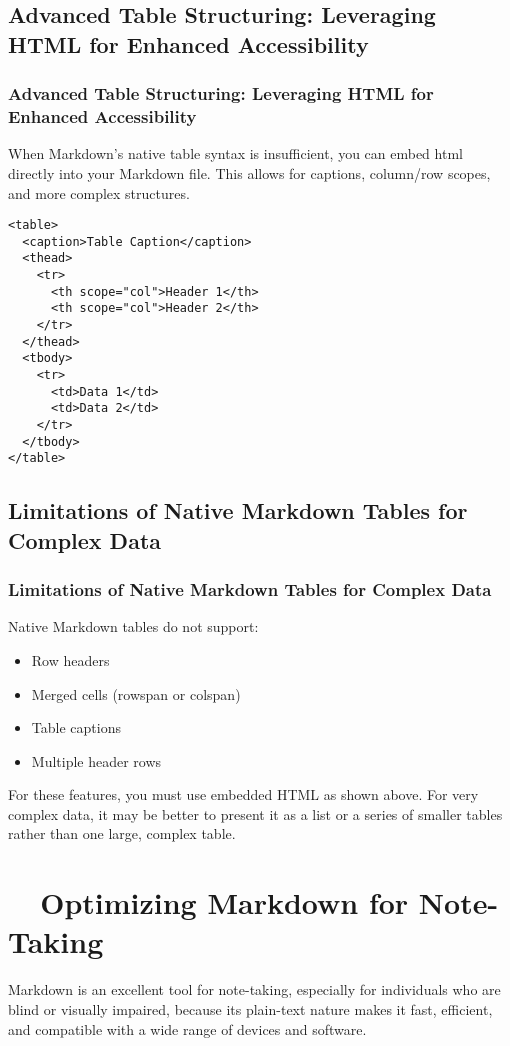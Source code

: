 \subsection{Advanced Table Structuring: Leveraging HTML for Enhanced Accessibility}
\label{subsec:markdown-html-tables}
\subsubsection{Advanced Table Structuring: Leveraging HTML for Enhanced Accessibility}
\label{ssubsec:markdown-html-tables-details}
When Markdown's native table syntax is insufficient, you can embed \gls{html} directly into your Markdown file. This allows for captions, column/row scopes, and more complex structures.
\begin{verbatim}
<table>
  <caption>Table Caption</caption>
  <thead>
    <tr>
      <th scope="col">Header 1</th>
      <th scope="col">Header 2</th>
    </tr>
  </thead>
  <tbody>
    <tr>
      <td>Data 1</td>
      <td>Data 2</td>
    </tr>
  </tbody>
</table>
\end{verbatim}

\subsection{Limitations of Native Markdown Tables for Complex Data}
\label{subsec:markdown-table-limitations}
\subsubsection{Limitations of Native Markdown Tables for Complex Data}
\label{ssubsec:markdown-table-limitations-details}
Native Markdown tables do not support:
\begin{itemize}
	\item Row headers
	\item Merged cells (rowspan or colspan)
	\item Table captions
	\item Multiple header rows
\end{itemize}
For these features, you must use embedded HTML as shown above. For very complex data, it may be better to present it as a list or a series of smaller tables rather than one large, complex table.

\section{~~Optimizing Markdown for Note-Taking}
\label{sec:markdown-for-notetaking}
Markdown is an excellent tool for note-taking, especially for individuals who are blind or visually impaired, because its plain-text nature makes it fast, efficient, and compatible with a wide range of devices and software.

